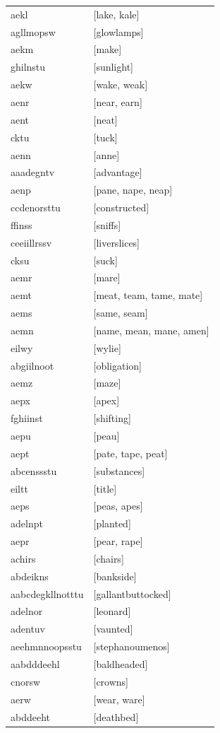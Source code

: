 \documentclass{article}
\begin{document}
\begin{tabular}{ll}
aekl & [lake, kale] \\
agllmopsw & [glowlamps] \\
aekm & [make] \\
ghilnstu & [sunlight] \\
aekw & [wake, weak] \\
aenr & [near, earn] \\
aent & [neat] \\
cktu & [tuck] \\
aenn & [anne] \\
aaadegntv & [advantage] \\
aenp & [pane, nape, neap] \\
ccdenorsttu & [constructed] \\
ffinss & [sniffs] \\
ceeiillrssv & [liverslices] \\
cksu & [suck] \\
aemr & [mare] \\
aemt & [meat, team, tame, mate] \\
aems & [same, seam] \\
aemn & [name, mean, mane, amen] \\
eilwy & [wylie] \\
abgiilnoot & [obligation] \\
aemz & [maze] \\
aepx & [apex] \\
fghiinst & [shifting] \\
aepu & [peau] \\
aept & [pate, tape, peat] \\
abcenssstu & [substances] \\
eiltt & [title] \\
aeps & [peas, apes] \\
adelnpt & [planted] \\
aepr & [pear, rape] \\
achirs & [chairs] \\
abdeikns & [bankside] \\
aabcdegkllnotttu & [gallantbuttocked] \\
adelnor & [leonard] \\
adentuv & [vaunted] \\
aeehmnnoopsstu & [stephanoumenos] \\
aabdddeehl & [baldheaded] \\
cnorsw & [crowns] \\
aerw & [wear, ware] \\
abddeeht & [deathbed] \\

\end{tabular}
\end{document}
